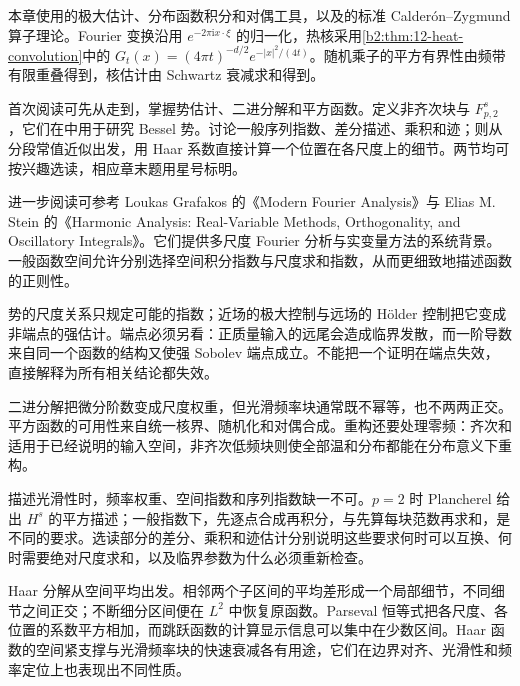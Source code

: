\ProseParagraphBreak

本章使用的极大估计、分布函数积分和对偶工具，以及的标准 Calderón--Zygmund 算子理论。Fourier 变换沿用 \(e^{-2\pi\mathrm i x\cdot\xi}\) 的归一化，热核采用\cref{b2:thm:12-heat-convolution}中的 \(G_t(x)=(4\pi t)^{-d/2}e^{-|x|^2/(4t)}\)。随机乘子的平方有界性由频带有限重叠得到，核估计由 Schwartz 衰减求和得到。

\ProseParagraphBreak

首次阅读可先从走到，掌握势估计、二进分解和平方函数。定义非齐次块与 \(F^s_{p,2}\)，它们在中用于研究 Bessel 势。讨论一般序列指数、差分描述、乘积和迹；则从分段常值近似出发，用 Haar 系数直接计算一个位置在各尺度上的细节。两节均可按兴趣选读，相应章末题用星号标明。

\ProseParagraphBreak

进一步阅读可参考 Loukas Grafakos 的《Modern Fourier Analysis》\cite{Grafakos2014Modern}与 Elias M. Stein 的《Harmonic Analysis: Real-Variable Methods, Orthogonality, and Oscillatory Integrals》\cite{Stein1993Harmonic}。它们提供多尺度 Fourier 分析与实变量方法的系统背景。一般函数空间允许分别选择空间积分指数与尺度求和指数，从而更细致地描述函数的正则性。








\begin{chaptersummary}
势的尺度关系只规定可能的指数；近场的极大控制与远场的 Hölder 控制把它变成非端点的强估计。端点必须另看：正质量输入的远尾会造成临界发散，而一阶导数来自同一个函数的结构又使强 Sobolev 端点成立。不能把一个证明在端点失效，直接解释为所有相关结论都失效。

\ProseParagraphBreak

二进分解把微分阶数变成尺度权重，但光滑频率块通常既不幂等，也不两两正交。平方函数的可用性来自统一核界、随机化和对偶合成。重构还要处理零频：齐次和适用于已经说明的输入空间，非齐次低频块则使全部温和分布都能在分布意义下重构。

\ProseParagraphBreak

描述光滑性时，频率权重、空间指数和序列指数缺一不可。\(p=2\) 时 Plancherel 给出 \(H^s\) 的平方描述；一般指数下，先逐点合成再积分，与先算每块范数再求和，是不同的要求。选读部分的差分、乘积和迹估计分别说明这些要求何时可以互换、何时需要绝对尺度求和，以及临界参数为什么必须重新检查。

\ProseParagraphBreak

Haar 分解从空间平均出发。相邻两个子区间的平均差形成一个局部细节，不同细节之间正交；不断细分区间便在 \(L^2\) 中恢复原函数。Parseval 恒等式把各尺度、各位置的系数平方相加，而跳跃函数的计算显示信息可以集中在少数区间。Haar 函数的空间紧支撑与光滑频率块的快速衰减各有用途，它们在边界对齐、光滑性和频率定位上也表现出不同性质。
\end{chaptersummary}

